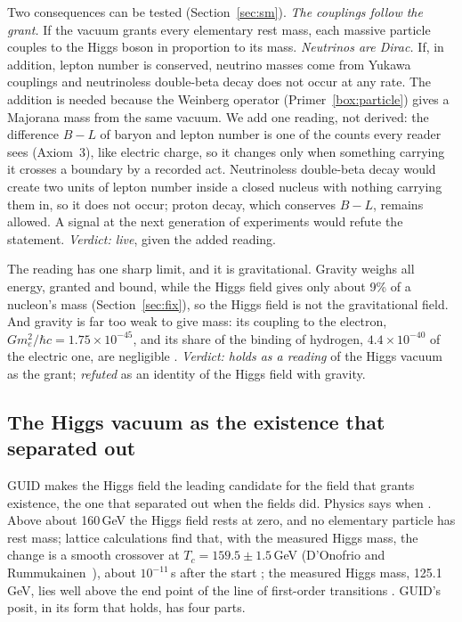 Two consequences can be tested (Section~\ref{sec:sm}). \emph{The couplings follow the grant.} If the vacuum grants every elementary
rest mass, each massive particle couples to the Higgs boson in proportion to its mass. \emph{Neutrinos are Dirac.} If, in addition,
lepton number is conserved, neutrino masses come from Yukawa couplings and neutrinoless double-beta decay does not occur at any rate. The
addition is needed because the Weinberg operator (Primer~\ref{box:particle}) gives a Majorana mass from the same vacuum. We add one reading, not derived: the difference $B-L$ of baryon and lepton number is one
of the counts every reader sees (Axiom~3), like electric charge, so it changes only when something carrying it crosses a boundary by a
recorded act. Neutrinoless double-beta decay would create two units of lepton number inside a closed nucleus with nothing carrying them
in, so it does not occur; proton decay, which conserves $B-L$, remains allowed. A signal at the next generation of experiments would refute
the statement. \emph{Verdict: live}, given the added reading.

The reading has one sharp limit, and it is gravitational. Gravity weighs all energy, granted and bound, while the Higgs field gives only
about 9\% of a nucleon's mass (Section~\ref{sec:fix}), so the Higgs field is not the gravitational field. And gravity is far too weak to give mass: its coupling to the electron,
$Gm_e^2/\hbar c=1.75\times10^{-45}$, and its share of the binding of hydrogen, $4.4\times10^{-40}$ of the electric one, are negligible
. \emph{Verdict: holds as a reading} of the Higgs vacuum as the grant; \emph{refuted} as an identity of the Higgs field with
gravity.

\subsection{The Higgs vacuum as the existence that separated out}\label{sec:higgsplit}

GUID makes the Higgs field the leading candidate for the field that grants existence, the one that separated out when the fields did.
Physics says when \tagP. Above about 160\,GeV the Higgs field rests at zero, and no elementary particle has rest mass; lattice calculations
find that, with the measured Higgs mass, the change is a smooth crossover at $T_c=159.5\pm1.5$\,GeV (D'Onofrio and
Rummukainen~\cite{donofrio}), about $10^{-11}$\,s after the start ; the measured Higgs mass, 125.1\,GeV, lies well above the end
point of the line of first-order transitions . GUID's posit, in its form that holds, has four parts.

